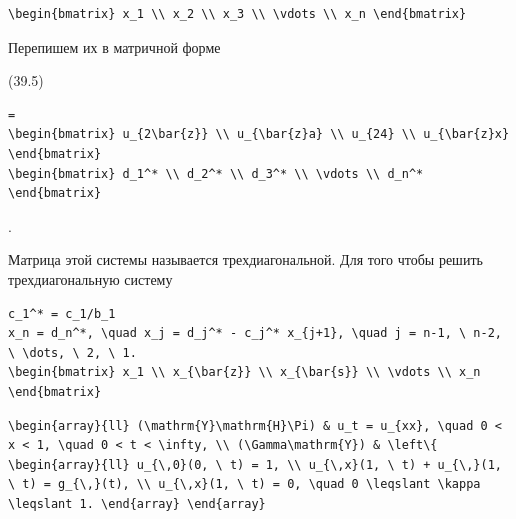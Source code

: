 \documentclass[
  ukrainian,
]{article}
\begin{document}
\begin{verbatim}
\begin{bmatrix} x_1 \\ x_2 \\ x_3 \\ \vdots \\ x_n \end{bmatrix}
\end{verbatim}

Перепишем их в матричной форме

(39.5)

\begin{verbatim}
=
\begin{bmatrix} u_{2\bar{z}} \\ u_{\bar{z}a} \\ u_{24} \\ u_{\bar{z}x} \end{bmatrix}
\begin{bmatrix} d_1^* \\ d_2^* \\ d_3^* \\ \vdots \\ d_n^* \end{bmatrix}
\end{verbatim}

.

Матрица этой системы называется трехдиагональной. Для того чтобы решить
трехдиагональную систему

\begin{verbatim}
c_1^* = c_1/b_1
x_n = d_n^*, \quad x_j = d_j^* - c_j^* x_{j+1}, \quad j = n-1, \ n-2, \ \dots, \ 2, \ 1.
\begin{bmatrix} x_1 \\ x_{\bar{z}} \\ x_{\bar{s}} \\ \vdots \\ x_n \end{bmatrix}
\end{verbatim}

\begin{verbatim}
\begin{array}{ll} (\mathrm{Y}\mathrm{H}\Pi) & u_t = u_{xx}, \quad 0 < x < 1, \quad 0 < t < \infty, \\ (\Gamma\mathrm{Y}) & \left\{ \begin{array}{ll} u_{\,0}(0, \ t) = 1, \\ u_{\,x}(1, \ t) + u_{\,}(1, \ t) = g_{\,}(t), \\ u_{\,x}(1, \ t) = 0, \quad 0 \leqslant \kappa \leqslant 1. \end{array} \end{array}
\end{verbatim}
\end{document}
